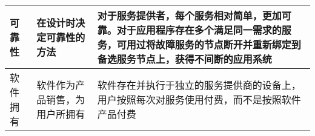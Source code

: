 \begin{spacing}{1.2}
\begin{longtable}{|m{1.8cm}<{\centering}|m{6.5cm}|m{6.5cm}|}
    可靠性         & 在设计时决定可靠性的方法                                            & 对于服务提供者，每个服务相对简单，更加可靠。对于应用程序存在多个满足同一需求的服务，可用过将故障服务的节点断开并重新绑定到备选服务节点上，获得不间断的应用系统               \\ \hline
    软件拥有        & 软件作为产品销售，为用户所拥有                                         & 软件存在并执行于独立的服务提供商的设备上，用户按照每次对服务使用付费，而不是按照软件产品付费                                                \\ \hline
    \end{longtable}
	\end{spacing}
\vspace{-0.5em}
